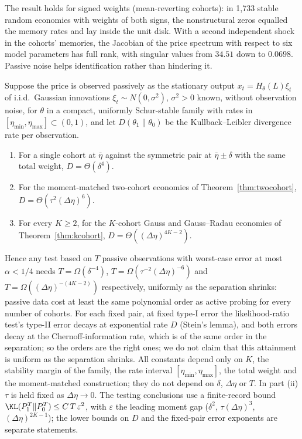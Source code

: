 The result holds for signed weights (mean-reverting cohorts): in 1,733 stable random economies with weights of both signs, the nonstructural zeros equalled the memory rates and lay inside the unit disk. With a second independent shock in the cohorts' memories, the Jacobian of the price spectrum with respect to six model parameters has full rank, with singular values from $34.51$ down to $0.0698$. Passive noise helps identification rather than hindering it.

\begin{theorem}\label{prop:passive}
Suppose the price is observed passively as the stationary output $x_t=H_\theta(L)\xi_t$ of i.i.d.\ Gaussian innovations $\xi_t\sim N(0,\sigma^2)$, $\sigma^2>0$ known, without observation noise, for $\theta$ in a compact, uniformly Schur-stable family with rates in $[\eta_{\min},\eta_{\max}]\subset(0,1)$, and let $D(\theta_1\|\theta_0)$ be the Kullback--Leibler divergence rate per observation.
\begin{enumerate}[label=(\roman*)]
\item For a single cohort at $\bar\eta$ against the symmetric pair at $\bar\eta\pm\delta$ with the same total weight, $D=\Theta(\delta^4)$.
\item For the moment-matched two-cohort economies of Theorem~\ref{thm:twocohort}, $D=\Theta(\tau^2(\Delta\eta)^6)$.
\item For every $K\ge2$, for the $K$-cohort Gauss and Gauss--Radau economies of Theorem~\ref{thm:kcohort}, $D=\Theta((\Delta\eta)^{4K-2})$.
\end{enumerate}
Hence any test based on $T$ passive observations with worst-case error at most $\alpha<1/4$ needs $T=\Omega(\delta^{-4})$, $T=\Omega(\tau^{-2}(\Delta\eta)^{-6})$ and $T=\Omega((\Delta\eta)^{-(4K-2)})$ respectively, uniformly as the separation shrinks: passive data cost at least the same polynomial order as active probing for every number of cohorts. For each fixed pair, at fixed type-I error the likelihood-ratio test's type-II error decays at exponential rate $D$ (Stein's lemma), and both errors decay at the Chernoff-information rate, which is of the same order in the separation; so the orders are the right ones; we do not claim that this attainment is uniform as the separation shrinks. All constants depend only on $K$, the stability margin of the family, the rate interval $[\eta_{\min},\eta_{\max}]$, the total weight and the moment-matched construction; they do not depend on $\delta$, $\Delta\eta$ or $T$. In part (ii) $\tau$ is held fixed as $\Delta\eta\to0$. The testing conclusions use a finite-record bound $\KL(P_1^T\|P_0^T)\le C\,T\,\varepsilon^2$, with $\varepsilon$ the leading moment gap ($\delta^2$, $\tau(\Delta\eta)^3$, $(\Delta\eta)^{2K-1}$); the lower bounds on $D$ and the fixed-pair error exponents are separate statements.
\end{theorem}

